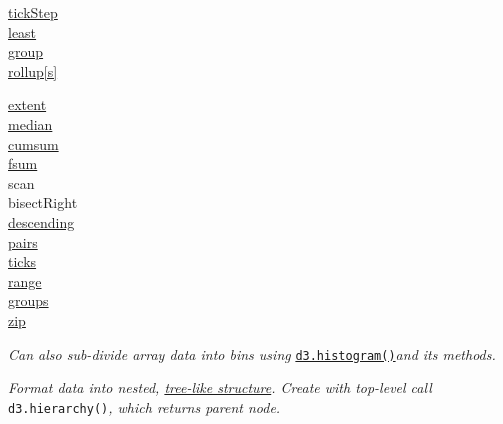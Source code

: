 {\begin{minipage}[t]{2.0cm}
    \href{https://observablehq.com/@d3/d3-ticks}{tickStep}\\
    \href{https://observablehq.com/@d3/d3-greatest}{least}\\
    \href{https://observablehq.com/@d3/d3-group-d3-rollup}{group}\\
    \href{https://observablehq.com/@d3/d3-group-d3-rollup}{rollup[s]}
\end{minipage}
\begin{minipage}[t]{2.0cm}
    \href{https://observablehq.com/@d3/d3-extent}{extent}\\
    \href{https://observablehq.com/@d3/d3-mean-d3-median-and-friends}{median}\\
    \href{https://observablehq.com/@d3/d3-cumsum}{cumsum}\\
    \href{https://observablehq.com/@d3/d3-fsum}{fsum}\\
    scan\\
    bisectRight\\
    \href{https://observablehq.com/@d3/d3-ascending}{descending}\\
    \href{https://observablehq.com/@d3/d3-pairs}{pairs}\\
    \href{https://observablehq.com/@d3/d3-ticks}{ticks}\\
    \href{https://observablehq.com/@d3/d3-range}{range}\\
    \href{https://observablehq.com/@d3/d3-group-d3-rollup}{groups}\\
    \href{https://observablehq.com/@d3/d3-transpose}{zip}
\end{minipage}
}


\textit{Can also sub-divide array data into bins using }\href{https://github.com/d3/d3-array/\#histograms}{\texttt{d3.histogram()}}\textit{and its methods.}

\textit{Format data into nested, \href{https://observablehq.com/@d3/d3-hierarchy}{tree-like structure}. Create with top-level call }\texttt{d3.hierarchy()}\textit{, which returns parent node.}

